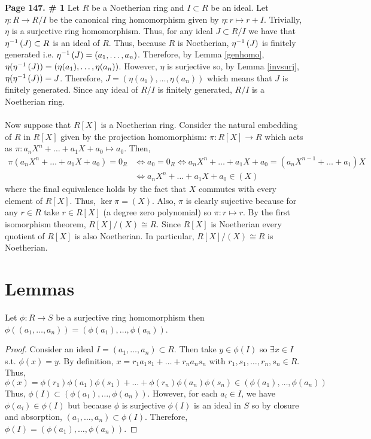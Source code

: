 \documentclass[12pt]{extarticle}
\begin{document}
\textbf{Page 147. \# 1} Let $R$ be a Noetherian ring and $I \subset R$ be an ideal. Let $\eta : R \rightarrow R/I$ be the canonical ring homomorphism given by $\eta : r \mapsto r + I$. Trivially, $\eta$ is a surjective ring homomorphism. Thus, for any ideal $J \subset R/I$ we have that $\eta^{-1} \left( J \right) \subset R$ is an ideal of $R$. Thus, because $R$ is Noetherian, $\eta^{-1} \left( J \right)$ is finitely generated i.e. $\eta^{-1} \left( J \right) = (a_1, \dots, a_n)$. Therefore, by Lemma \ref{genhomo}, $\eta(\eta^{-1} \left( J \right)) = (\eta(a_1), \dots, \eta(a_n))$. However, $\eta$ is surjective so, by Lemma \ref{invsurj}, $\eta(\eta^{-1} \left( J \right)) = J$. Therefore, $J = (\eta(a_1), \dots, \eta(a_n))$ which means that $J$ is finitely generated. Since any ideal of $R/I$ is finitely generated, $R/I$ is a Noetherian ring. 
\\ \\

Now suppose that $R[X]$ is a Noetherian ring. Consider the natural embedding of $R$ in $R[X]$ given by the projection homomorphism: $\pi : R[X] \rightarrow R$ which acts as $\pi : a_n X^n + \dots + a_1 X + a_0 \mapsto a_0$. Then,
\begin{align*}
\pi(a_n X^n + \dots + a_1 X + a_0) = 0_R & \iff a_0 = 0_R \iff a_n X^n + \dots + a_1 X + a_0 = (a_n X^{n-1} + \dots + a_1) X \\ & \iff a_n X^n + \dots + a_1 X + a_0 \in (X)
\end{align*}
where the final equivalence holds by the fact that $X$ commutes with every element of $R[X]$. Thus, $\ker{\pi} = (X)$. Also, $\pi$ is clearly sujective because for any $r \in R$ take $r \in R[X]$ (a degree zero polynomial) so $\pi : r \mapsto r$. By the first isomorphism theorem, $R[X]/(X) \cong R$. Since $R[X]$ is Noetherian every quotient of $R[X]$ is also Noetherian. In particular, $R[X]/(X) \cong R$ is Noetherian.    
\section*{Lemmas}

\begin{lemma} \label{genhomo}
Let $\phi : R \rightarrow S$ be a surjective ring homomorphism then $\phi((a_1, \dots , a_n)) = (\phi(a_1), \dots , \phi(a_n))$.
\end{lemma}
\begin{proof}
Consider an ideal $I = (a_1, \dots, a_n) \subset R$. Then take $y \in \phi(I)$ so $\exists x \in I$ s.t. $\phi(x) = y$. By definition, $x = r_1 a_1 s_1 + \dots + r_n a_n s_n$ with $r_1, s_1, \dots, r_n , s_n \in R$. Thus, \[\phi(x) = \phi(r_1) \phi(a_1) \phi(s_1) + \dots + \phi(r_n) \phi(a_n) \phi(s_n) \in (\phi(a_1), \dots, \phi(a_n))\] Thus, $\phi(I) \subset (\phi(a_1), \dots, \phi(a_n))$. However, for each $a_i \in I$, we have $\phi(a_i) \in \phi(I)$ but because $\phi$ is surjective $\phi(I)$ is an ideal in $S$ so by closure and absorption, $(a_1, \dots, a_n) \subset \phi(I)$. Therefore, $\phi(I) = (\phi(a_1), \dots, \phi(a_n))$.
\end{proof}
\end{document}
